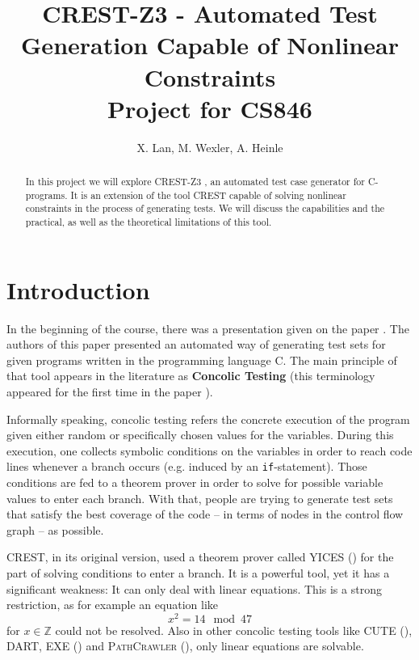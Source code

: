 \documentclass[oribibl]{llncs}
\newcommand{\ZZ}{{\mathbb{Z}}}
\begin{document}
\title{\textsc{CREST-Z3} - Automated Test Generation Capable of Nonlinear Constraints\\[12pt]
Project for CS846}

\author{X. Lan, M. Wexler, A. Heinle}


\maketitle

\begin{abstract}
  In this project we will explore \textsc{CREST-Z3} \cite{CRESTZ3}, an automated test case generator for C-programs. It is an extension of the tool \textsc{CREST} \cite{CREST} capable of solving nonlinear constraints in the process of generating tests. We will discuss the capabilities and the practical, as well as the theoretical limitations of this tool.
\end{abstract}


\section{Introduction}

In the beginning of the course, there was a presentation given on the
paper \cite{godefroid2005dart}. The authors of this paper presented an
automated way of generating test sets for given programs written in
the programming language \textsc{C}. The main principle of that tool
appears in the literature as \textbf{Concolic Testing} (this terminology appeared
for the first time in the paper \cite{sen2005cute}).

Informally speaking, concolic testing refers the concrete
execution of the program given either random or specifically chosen
values for the variables. During this execution, one collects symbolic
conditions on the
variables in order to reach code lines whenever a branch occurs
(e.g. induced by an \texttt{if}-statement). Those conditions are fed
to a theorem prover in order to solve for possible variable values to
enter each branch. With that, people are trying to generate test sets
that satisfy the best coverage of the code -- in terms of nodes in the
control flow graph -- as possible.

\textsc{CREST}, in its original version, used a theorem prover called
\textsc{YICES} (\cite{dutertre2006yices}) for the part of solving
conditions to enter a branch. It is a powerful tool, yet it has a
significant weakness: It can only deal with linear equations. This is
a strong restriction, as for example an equation like
$$x^2 = 14 \mod 47$$
for $x \in \ZZ$ could not be resolved.
Also in other concolic testing tools like \textsc{CUTE}
(\cite{sen2005cute}), \textsc{DART},
\textsc{EXE} (\cite{cadar2008exe}) and \textsc{PathCrawler}
(\cite{williams2005pathcrawler}), only linear equations are solvable.
\end{document}
